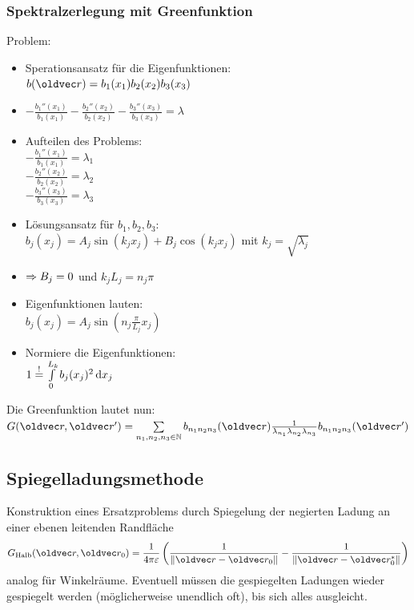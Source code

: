 \documentclass[6pt,a4paper]{scrartcl}
\let\vec\oldvec
\begin{document}
\begin{multicols}{4}
	\subsubsection*{Spektralzerlegung mit Greenfunktion}
	Problem: 

	\begin{itemize}
		\item Sperationsansatz für die Eigenfunktionen: \\
		$b(\vec r) = b_1 (x_1) b_2(x_2) b_3(x_3)$
		\item $- \frac{b_1''(x_1)}{b_1 (x_1)} - \frac{b_2''(x_2)}{b_2 (x_2)}  - \frac{b_3''(x_3)}{b_3 (x_3)} = \lambda$
		\item Aufteilen des Problems: \\
		$- \frac{b_1''(x_1)}{b_1 (x_1)} = \lambda_1$ \\
		$- \frac{b_2''(x_2)}{b_2 (x_2)} = \lambda_2$ \\
		$- \frac{b_3''(x_3)}{b_3 (x_3)} = \lambda_3$
		\item Lösungsansatz für $b_1, b_2, b_3$: \\
		$b_j (x_j) = A_j \sin(k_j x_j) + B_j \cos (k_j x_j)$ mit $k_j = \sqrt{\lambda_j}$
		\item $\Rightarrow B_j = 0$ und $k_j L_j = n_j \pi$
		\item Eigenfunktionen lauten: \\
		$b_j ( x_j ) = A_j \sin (n_j \frac{\pi}{L_j} x_j)$
		\item Normiere die Eigenfunktionen: \\
			$1 \overset{!}{=} \int \limits_0^{L_k} b_j (x_j)^2 \diff x_j$
	\end{itemize}
	
	Die Greenfunktion lautet nun: \\
	$G(\vec r, \vec r') = \sum \limits_{n_1, n_2 , n_3 \in \mathbb N} b_{n_1 n_2 n_3} (\vec r ) \frac{1}{\lambda_{n_1}\lambda_{n_2}\lambda_{n_3}} b_{n_1 n_2 n_3} (\vec r' )$
	\subsection*{Spiegelladungsmethode}
	Konstruktion eines Ersatzproblems durch Spiegelung der negierten Ladung an einer ebenen leitenden Randfläche\\
	\begin{align*}
		G_{\text{Halb}}(\vec r, \vec r_0) = \frac{1}{4 \pi \varepsilon} \left( \frac{1}{\norm{\vec r - \vec r_0}} - \frac{1}{\norm{\vec r - \vec r_0^*}}\right)
	\end{align*}
	analog für Winkelräume. Eventuell müssen die gespiegelten Ladungen wieder gespiegelt werden (möglicherweise unendlich oft), bis sich alles ausgleicht.
	

\end{multicols}
\end{document}
